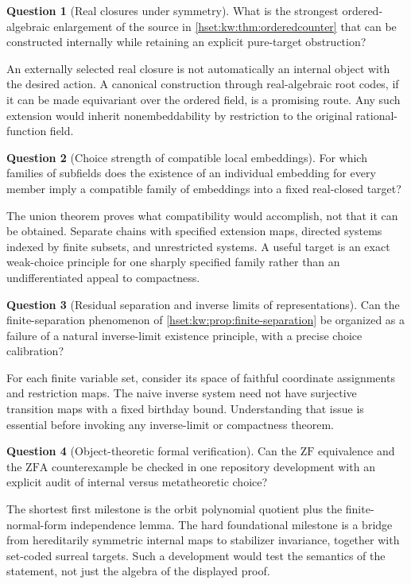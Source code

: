 \documentclass[11pt,letterpaper]{article}
\theoremstyle{definition}
\newtheorem{question}[question]{Question}\aliascntresetthe{question}
\theoremstyle{remark}
\newcommand{\ZF}{\mathrm{ZF}}
\newcommand{\ZFA}{\mathrm{ZFA}}
\begin{document}
\begin{question}[Real closures under symmetry]\label{hset:kw:q:realclosures}
What is the strongest ordered-algebraic enlargement of the source in \cref{hset:kw:thm:orderedcounter} that can be constructed internally while retaining an explicit pure-target obstruction?
\end{question}
An externally selected real closure is not automatically an internal object with the desired action. A canonical construction through real-algebraic root codes, if it can be made equivariant over the ordered field, is a promising route. Any such extension would inherit nonembeddability by restriction to the original rational-function field.

\begin{question}[Choice strength of compatible local embeddings]\label{hset:kw:q:compatible}
For which families of subfields does the existence of an individual embedding for every member imply a compatible family of embeddings into a fixed real-closed target?
\end{question}
The union theorem proves what compatibility would accomplish, not that it can be obtained. Separate chains with specified extension maps, directed systems indexed by finite subsets, and unrestricted systems. A useful target is an exact weak-choice principle for one sharply specified family rather than an undifferentiated appeal to compactness.

\begin{question}[Residual separation and inverse limits of representations]\label{hset:kw:q:inverselimits}
Can the finite-separation phenomenon of \cref{hset:kw:prop:finite-separation} be organized as a failure of a natural inverse-limit existence principle, with a precise choice calibration?
\end{question}
For each finite variable set, consider its space of faithful coordinate assignments and restriction maps. The naive inverse system need not have surjective transition maps with a fixed birthday bound. Understanding that issue is essential before invoking any inverse-limit or compactness theorem.

\begin{question}[Object-theoretic formal verification]\label{hset:kw:q:formal}
Can the $\ZF$ equivalence and the $\ZFA$ counterexample be checked in one repository development with an explicit audit of internal versus metatheoretic choice?
\end{question}
The shortest first milestone is the orbit polynomial quotient plus the finite-normal-form independence lemma. The hard foundational milestone is a bridge from hereditarily symmetric internal maps to stabilizer invariance, together with set-coded surreal targets. Such a development would test the semantics of the statement, not just the algebra of the displayed proof.
\end{document}
